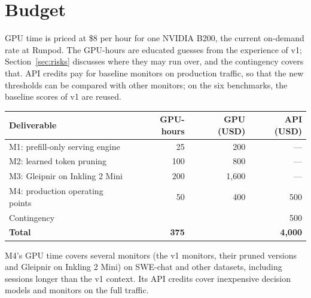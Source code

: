 \section{Budget}
\label{sec:budget}
GPU time is priced at \$8 per hour for one NVIDIA B200, the current on-demand
rate at Runpod. The GPU-hours are educated guesses from the experience of v1;
Section~\ref{sec:risks} discusses where they may run over, and the contingency
covers that. API credits pay for baseline monitors on production traffic, so
that the new thresholds can be compared with other monitors; on the six
benchmarks, the baseline scores of v1 are reused.

\begin{tabularx}{\linewidth}{@{}Xrrr@{}}
\toprule
Deliverable & GPU-hours & GPU (USD) & API (USD) \\
\midrule
M1: prefill-only serving engine & 25 & 200 & --- \\
M2: learned token pruning & 100 & 800 & --- \\
M3: Gleipnir on Inkling 2 Mini & 200 & 1,600 & --- \\
M4: production operating points & 50 & 400 & 500 \\
\midrule
Contingency & & \multicolumn{2}{r}{500} \\
\midrule
\textbf{Total} & \textbf{375} & \multicolumn{2}{r}{\textbf{4,000}} \\
\bottomrule
\end{tabularx}

M4's GPU time covers several monitors (the v1 monitors, their pruned versions
and Gleipnir on Inkling 2 Mini) on SWE-chat and other datasets, including
sessions longer than the v1 context. Its API credits cover inexpensive
decision models and monitors on the full traffic.
